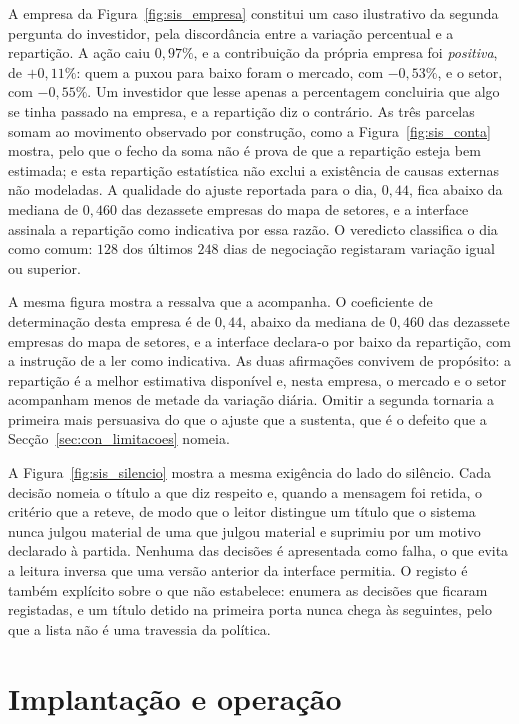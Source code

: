 A empresa da Figura~\ref{fig:sis_empresa} constitui um caso ilustrativo da segunda pergunta do
investidor, pela discordância entre a variação percentual e a repartição. A ação caiu $0{,}97\%$, e a
contribuição da própria empresa foi \emph{positiva}, de $+0{,}11\%$: quem a puxou para baixo foram
o mercado, com $-0{,}53\%$, e o setor, com $-0{,}55\%$. Um investidor que lesse apenas a percentagem
concluiria que algo se tinha passado na empresa, e a repartição diz o contrário. As três parcelas
somam ao movimento observado por construção, como a Figura~\ref{fig:sis_conta} mostra, pelo que o
fecho da soma não é prova de que a repartição esteja bem estimada; e esta repartição estatística
não exclui a existência de causas externas não modeladas. A qualidade do ajuste reportada para o dia,
$0{,}44$, fica abaixo da mediana de $0{,}460$ das dezassete empresas do mapa de setores, e a interface
assinala a repartição como indicativa por essa razão. O veredicto classifica o dia como comum:
$128$ dos últimos $248$ dias de negociação registaram variação igual ou superior.


A mesma figura mostra a ressalva que a acompanha. O coeficiente de determinação desta empresa é
de $0{,}44$, abaixo da mediana de $0{,}460$ das dezassete empresas do mapa de setores, e a interface
declara-o por baixo da repartição, com a instrução de a ler como indicativa. As duas afirmações
convivem de propósito: a repartição é a melhor estimativa disponível e, nesta empresa, o mercado e
o setor acompanham menos de metade da variação diária. Omitir a segunda tornaria a primeira mais persuasiva do que
o ajuste que a sustenta, que é o defeito que a Secção~\ref{sec:con_limitacoes} nomeia.

A Figura~\ref{fig:sis_silencio} mostra a mesma exigência do lado do silêncio. Cada decisão
nomeia o título a que diz respeito e, quando a mensagem foi retida, o critério que a reteve, de
modo que o leitor distingue um título que o sistema nunca julgou material de uma que julgou
material e suprimiu por um motivo declarado à partida. Nenhuma das decisões é apresentada como
falha, o que evita a leitura inversa que uma versão anterior da interface permitia. O registo é
também explícito sobre o que não estabelece: enumera as decisões que ficaram registadas, e um
título detido na primeira porta nunca chega às seguintes, pelo que a lista não é uma travessia
da política.

\section{Implantação e operação}
\label{sec:sis_operacao}

